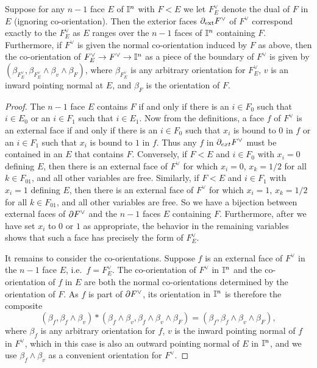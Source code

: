 \begin{lemma}\label{L: ext faces}
	Suppose for any $n-1$ face $E$ of $\mathbb{I}^n$ with $F<E$ we let $F_E^\vee$ denote the dual of $F$ in $E$ (ignoring co-orientation).
	Then the exterior faces $\partial_{\text{ext}}F^\vee$ of $F^\vee$ correspond exactly to the $F_E^\vee$ as $E$ ranges over the $n-1$ faces of $\mathbb{I}^n$ containing $F$.
	Furthermore, if $F^\vee$ is given the normal co-orientation induced by $F$ as above, then the co-orientation of $F^\vee_E \to F^\vee \to \mathbb{I}^n$ as a piece of the boundary of $F^\vee$ is given by $(\beta_{F_E^\vee},\beta_{F_E^\vee} \wedge \beta_v \wedge \beta_F)$, where $\beta_{F_E^\vee}$ is any arbitrary orientation for $F_E^\vee$, $v$ is an inward pointing normal at $E$, and $\beta_F$ is the orientation of $F$.
\end{lemma}

\begin{proof}
	The $n-1$ face $E$ contains $F$ if and only if there is an $i \in F_0$ such that $i \in E_0$ or an $i \in F_1$ such that $i \in E_1$.
	Now from the definitions, a face $f$ of $F^\vee$ is an external face if and only if there is an $i \in F_0$ such that $x_i$ is bound to $0$ in $f$ or an $i \in F_1$ such that $x_i$ is bound to $1$ in $f$.
	Thus any $f$ in $\partial_{ext}F^\vee$ must be contained in an $E$ that contains $F$.
	Conversely, if $F<E$ and $i \in F_0$ with $x_i = 0$ defining $E$, then there is an external face of $F^\vee$ for which $x_i = 0$, $x_k = 1/2$ for all $k \in F_{01}$, and all other variables are free.
	Similarly, if $F<E$ and $i \in F_1$ with $x_i = 1$ defining $E$, then there is an external face of $F^\vee$ for which $x_i = 1$, $x_k = 1/2$ for all $k \in F_{01}$, and all other variables are free.
	So we have a bijection between external faces of $\partial F^\vee$ and the $n-1$ faces $E$ containing $F$.
	Furthermore, after we have set $x_i$ to $0$ or $1$ as appropriate, the behavior in the remaining variables shows that such a face has precisely the form of $F^\vee_E$.

	It remains to consider the co-orientations.
	Suppose $f$ is an external face of $F^\vee$ in the $n-1$ face $E$, i.e.\ $f = F^\vee_E$.
	The co-orientation of $F^\vee$ in $\mathbb{I}^n$ and the co-orientation of $f$ in $E$ are both the normal co-orientations determined by the orientation of $F$.
	As $f$ is part of $\partial F^\vee$, its orientation in $\mathbb{I}^n$ is therefore the composite $$(\beta_f,\beta_f \wedge \beta_v)*(\beta_f \wedge \beta_v,\beta_f \wedge \beta_v \wedge \beta_F) = (\beta_f,\beta_f \wedge \beta_v \wedge \beta_F),$$ where $\beta_f$ is any arbitrary orientation for $f$, $v$ is the inward pointing normal of $f$ in $F^\vee$, which in this case is also an outward pointing normal of $E$ in $\mathbb{I}^n$, and we use $\beta_f \wedge \beta_v$ as a convenient orientation for $F^\vee$.
\end{proof}

